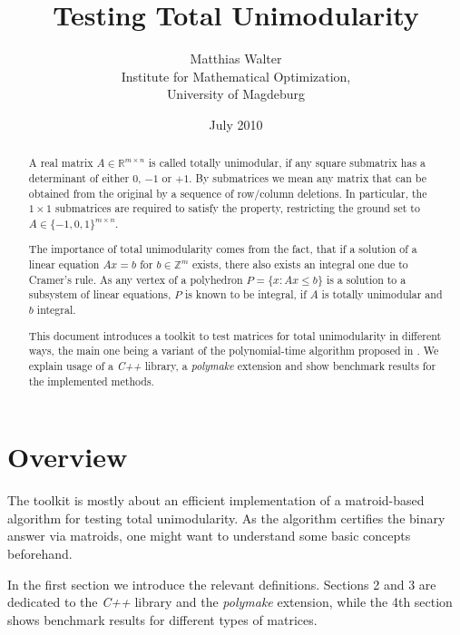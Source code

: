 \documentclass[12pt]{article}
\newcommand{\R}{\ensuremath{\mathbb{R}}}
\newcommand{\Z}{\ensuremath{\mathbb{Z}}}
\newcommand{\Cpp}{{\em C++ }}
\newcommand{\Polymake}{{\em polymake }}
\begin{document}
\topmargin 20mm
\pagestyle{empty}


\title{\huge \bf Testing Total Unimodularity }

\date{July 2010}
\author{Matthias Walter\\ Institute for Mathematical Optimization, \\ University of Magdeburg}

\maketitle

\begin{abstract}
A real matrix $A \in \R^{m \times n}$ is called totally unimodular, if any square submatrix
has a determinant of either $0$, $-1$ or $+1$. By submatrices we mean any matrix that can be obtained from
the original by a sequence of row/column deletions. In particular, the $1 \times 1$ submatrices
are required to satisfy the property, restricting the ground set to $A \in \{-1, 0, 1\}^{m \times n}$.

The importance of total unimodularity comes from the fact, that if a solution of
a linear equation $A x = b$ for $b \in \Z^m$ exists, there also exists an integral one due to Cramer's rule. As any vertex
of a polyhedron $P = \{ x : Ax \leq b \}$ is a solution to a subsystem of linear equations,
$P$ is known to be integral, if $A$ is totally unimodular and $b$ integral.

This document introduces a toolkit to test matrices for total unimodularity in different ways,
the main one being a variant of the polynomial-time algorithm proposed in \cite{Truemper90V}.
We explain usage of a \Cpp library, a \Polymake extension and show benchmark results for the implemented methods.

\end{abstract}

\bigskip

\section*{Overview}

The toolkit is mostly about an efficient implementation of a matroid-based algorithm for testing total unimodularity.
As the algorithm certifies the binary answer via matroids, one might want to understand some basic concepts beforehand.

In the first section we introduce the relevant definitions. Sections 2 and 3 are dedicated to the \Cpp library
and the \Polymake extension, while the 4th section shows benchmark results for different types of matrices.
\end{document}
